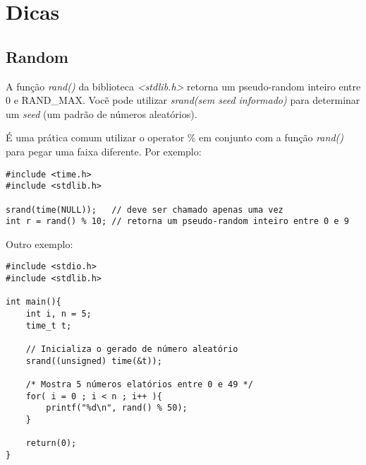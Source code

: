 \documentclass[defesa,oneside]{ppginf}
\begin{document}

\appendix

\chapter{Dicas}

\section{Random}

A função \emph{rand()} da biblioteca \emph{<stdlib.h>} retorna um pseudo-random inteiro entre 0 e RAND\_MAX. Vocẽ pode utilizar \emph{srand(sem seed informado)} para determinar um \textit{seed} (um padrão de números aleatórios). 

É uma prática comum utilizar o operator \% em conjunto com a função \emph{rand()} para pegar uma faixa diferente. Por exemplo:

\begin{lstlisting}
#include <time.h>
#include <stdlib.h>

srand(time(NULL));   // deve ser chamado apenas uma vez
int r = rand() % 10; // retorna um pseudo-random inteiro entre 0 e 9 
\end{lstlisting}

Outro exemplo:

\begin{lstlisting}
#include <stdio.h>
#include <stdlib.h>

int main(){
	int i, n = 5;
	time_t t;
	
	// Inicializa o gerado de número aleatório		
	srand((unsigned) time(&t)); 
	
	/* Mostra 5 números elatórios entre 0 e 49 */
	for( i = 0 ; i < n ; i++ ){
		printf("%d\n", rand() % 50);
	}
	
	return(0);
}
\end{lstlisting}
\end{document}
